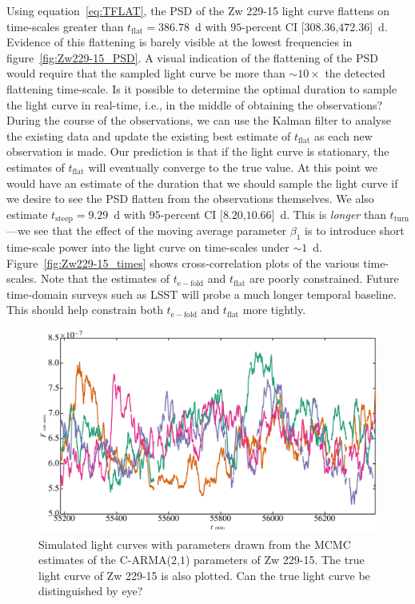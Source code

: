 \documentclass[a4paper,fleqn,usenatbib]{mnras}
\begin{document}
Using equation~\eqref{eq:TFLAT}, the PSD of the Zw 229-15 light curve flattens on time-scales greater than $t_{\mathrm{flat}} = 386.78$~d with $95$-percent CI [$308.36$,$472.36$]~d. Evidence of this flattening is barely visible at the lowest frequencies in figure~\ref{fig:Zw229-15_PSD}. A visual indication of the flattening of the PSD would require that the sampled light curve be more than $\sim 10 \times$ the detected flattening time-scale. Is it possible to determine the optimal duration to sample the light curve in real-time, i.e., in the middle of obtaining the observations? During the course of the observations, we can use the Kalman filter to analyse the existing data and update the existing best estimate of  $t_{\mathrm{flat}}$ as each new observation is made. Our prediction is that if the light curve is stationary, the estimates of $t_{\mathrm{flat}}$ will eventually converge to the true value. At this point we would have an estimate of the duration that we should sample the light curve if we desire to see the PSD flatten from the observations themselves. We also estimate $t_{\mathrm{steep}} = 9.29$~d with $95$-percent CI [$8.20$,$10.66$]~d. This is \textit{longer} than $t_{\mathrm{turn}}$---we see that the effect of the moving average parameter $\beta_{1}$ is to introduce short time-scale power into the light curve on time-scales under $\sim 1$~d. Figure~\ref{fig:Zw229-15_times} shows cross-correlation plots of the various time-scales. Note that the estimates of $t_\mathrm{e-fold}$ and $t_{\mathrm{flat}}$ are poorly constrained. Future time-domain surveys such as LSST will probe a much longer temporal baseline. This should help constrain both $t_{\mathrm{e-fold}}$ and $t_{\mathrm{flat}}$ more tightly.

\begin{figure}
	\includegraphics[width=\columnwidth]{Figure8.jpg}
    \caption{Simulated light curves with parameters drawn from the MCMC estimates of the C-ARMA($2$,$1$) parameters of Zw 229-15. The true light curve of Zw 229-15 is also plotted. Can the true light curve be distinguished by eye?}  
    \label{fig:Zw229-15_mock}
\end{figure}
\end{document}
